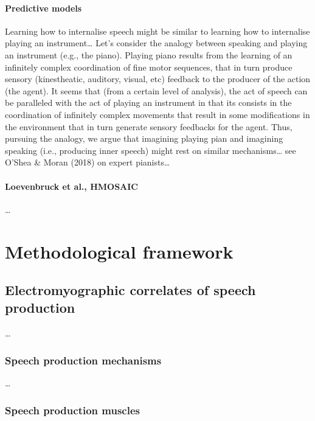 \documentclass[a4paper,12pt,twoside,openright,oldfontcommands]{memoir}
\begin{document}
\subsubsection{Predictive models}\label{predictive-models}

Learning how to internalise speech might be similar to learning how to
internalise playing an instrument\ldots{} Let's consider the analogy
between speaking and playing an instrument (e.g., the piano). Playing
piano results from the learning of an infinitely complex coordination of
fine motor sequences, that in turn produce sensory (kinestheatic,
auditory, visual, etc) feedback to the producer of the action (the
agent). It seems that (from a certain level of analysis), the act of
speech can be paralleled with the act of playing an instrument in that
its consists in the coordination of infinitely complex movements that
result in some modifications in the environment that in turn generate
sensory feedbacks for the agent. Thus, pursuing the analogy, we argue
that imagining playing pian and imagining speaking (i.e., producing
inner speech) might rest on similar mechanisms\ldots{} see O'Shea \&
Moran (2018) on expert pianists\ldots{}

\subsubsection{Loevenbruck et al.,
HMOSAIC}\label{loevenbruck-et-al.-hmosaic}

\ldots{}

\chapter{Methodological framework}\label{methodological-framework}

\section{Electromyographic correlates of speech
production}\label{electromyographic-correlates-of-speech-production}

\ldots{}

\subsection{Speech production
mechanisms}\label{speech-production-mechanisms}

\ldots{}

\subsection{Speech production muscles}\label{speech-production-muscles}
\end{document}

